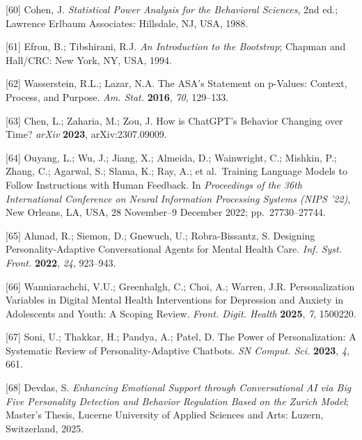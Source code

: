 {[}60{]} Cohen, J. \emph{Statistical Power Analysis for the Behavioral Sciences}, 2nd ed.; Lawrence Erlbaum Associates: Hillsdale, NJ, USA, 1988.

{[}61{]} Efron, B.; Tibshirani, R.J. \emph{An Introduction to the Bootstrap}; Chapman and Hall/CRC: New York, NY, USA, 1994.

{[}62{]} Wasserstein, R.L.; Lazar, N.A. The ASA's Statement on p-Values: Context, Process, and Purpose. \emph{Am. Stat.} \textbf{2016}, \emph{70}, 129--133.

{[}63{]} Chen, L.; Zaharia, M.; Zou, J. How is ChatGPT's Behavior Changing over Time? \emph{arXiv} \textbf{2023}, arXiv:2307.09009.

{[}64{]} Ouyang, L.; Wu, J.; Jiang, X.; Almeida, D.; Wainwright, C.; Mishkin, P.; Zhang, C.; Agarwal, S.; Slama, K.; Ray, A.; et al.~Training Language Models to Follow Instructions with Human Feedback. In \emph{Proceedings of the 36th International Conference on Neural Information Processing Systems (NIPS '22)}, New Orleans, LA, USA, 28 November--9 December 2022; pp.~27730--27744.

{[}65{]} Ahmad, R.; Siemon, D.; Gnewuch, U.; Robra-Bissantz, S. Designing Personality-Adaptive Conversational Agents for Mental Health Care. \emph{Inf. Syst. Front.} \textbf{2022}, \emph{24}, 923--943.

{[}66{]} Wanniarachchi, V.U.; Greenhalgh, C.; Choi, A.; Warren, J.R. Personalization Variables in Digital Mental Health Interventions for Depression and Anxiety in Adolescents and Youth: A Scoping Review. \emph{Front. Digit. Health} \textbf{2025}, \emph{7}, 1500220.

{[}67{]} Soni, U.; Thakkar, H.; Pandya, A.; Patel, D. The Power of Personalization: A Systematic Review of Personality-Adaptive Chatbots. \emph{SN Comput. Sci.} \textbf{2023}, \emph{4}, 661.

{[}68{]} Devdas, S. \emph{Enhancing Emotional Support through Conversational AI via Big Five Personality Detection and Behavior Regulation Based on the Zurich Model}; Master's Thesis, Lucerne University of Applied Sciences and Arts: Luzern, Switzerland, 2025.

